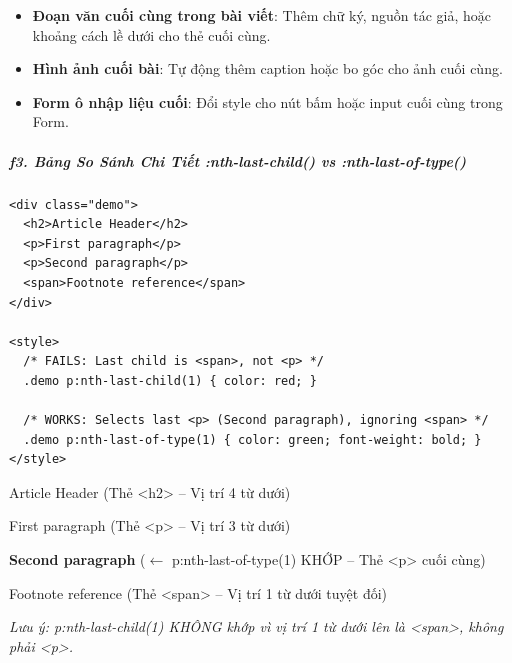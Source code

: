 \begin{conceptBox}
\begin{itemize}[leftmargin=1.5em, itemsep=3pt, parsep=0pt]
    \item \textbf{Đoạn văn cuối cùng trong bài viết}: Thêm chữ ký, nguồn tác giả, hoặc khoảng cách lề dưới cho thẻ  cuối cùng.
    \item \textbf{Hình ảnh cuối bài}: Tự động thêm caption hoặc bo góc cho ảnh  cuối cùng.
    \item \textbf{Form ô nhập liệu cuối}: Đổi style cho nút bấm hoặc input cuối cùng trong Form.
\end{itemize}
\end{conceptBox}


\subparagraph{f3. Bảng So Sánh Chi Tiết :nth-last-child() vs :nth-last-of-type()}
\mbox{}\par\vspace{2pt}

\begin{codeWindow}
\begin{lstlisting}[language=HTML5]
<div class="demo">
  <h2>Article Header</h2>
  <p>First paragraph</p>
  <p>Second paragraph</p>
  <span>Footnote reference</span>
</div>

<style>
  /* FAILS: Last child is <span>, not <p> */
  .demo p:nth-last-child(1) { color: red; }

  /* WORKS: Selects last <p> (Second paragraph), ignoring <span> */
  .demo p:nth-last-of-type(1) { color: green; font-weight: bold; }
</style>
\end{lstlisting}
\end{codeWindow}

\begin{browserWindow}
\sffamily\small
Article Header {\scriptsize\textcolor{gray!60}{(Thẻ <h2> -- Vị trí 4 từ dưới)}} \par\vspace{2pt}
First paragraph {\scriptsize\textcolor{gray!60}{(Thẻ <p> -- Vị trí 3 từ dưới)}} \par\vspace{2pt}
\textcolor{green!70!black}{\textbf{Second paragraph}} {\scriptsize\textcolor{gray!60}{($\leftarrow$ p:nth-last-of-type(1) KHỚP -- Thẻ <p> cuối cùng)}} \par\vspace{2pt}
Footnote reference {\scriptsize\textcolor{gray!60}{(Thẻ <span> -- Vị trí 1 từ dưới tuyệt đối)}} \par\vspace{4pt}
{\scriptsize\textcolor{gray!60}{\textit{Lưu ý: p:nth-last-child(1) KHÔNG khớp vì vị trí 1 từ dưới lên là <span>, không phải <p>.}}}
\end{browserWindow}

